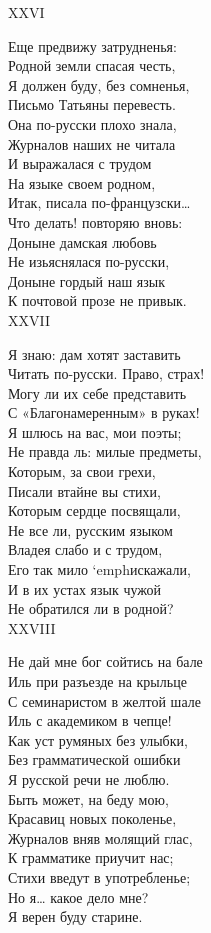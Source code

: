 {XXVI

Еще предвижу затрудненья:\\
Родной земли спасая честь,\\
Я должен буду, без сомненья,\\
Письмо Татьяны перевесть.\\
Она по-русски плохо знала,\\
Журналов наших не читала\\
И выражалася с трудом\\
На языке своем родном,\\
Итак, писала по-французски…\\
Что делать! повторяю вновь:\\
Доныне дамская любовь\\
Не изьяснялася по-русски,\\
Доныне гордый наш язык\\
К почтовой прозе не привык.\\

XXVII

Я знаю: дам хотят заставить\\
Читать по-русски. Право, страх!\\
Могу ли их себе представить\\
С «Благонамеренным» в руках!\\
Я шлюсь на вас, мои поэты;\\
Не правда ль: милые предметы,\\
Которым, за свои грехи,\\
Писали втайне вы стихи,\\
Которым сердце посвящали,\\
Не все ли, русским языком\\
Владея слабо и с трудом,\\
Его так мило `emph{искажали,}\\
И в их устах язык чужой\\
Не обратился ли в родной?\\

XXVIII

Не дай мне бог сойтись на бале\\
Иль при разъезде на крыльце\\
С семинаристом в желтой шале\\
Иль с академиком в чепце!\\
Как уст румяных без улыбки,\\
Без грамматической ошибки\\
Я русской речи не люблю.\\	
Быть может, на беду мою,\\
Красавиц новых поколенье,\\
Журналов вняв молящий глас,\\
К грамматике приучит нас;\\
Стихи введут в употребленье;\\
Но я… какое дело мне?\\
Я верен буду старине.\\

}
